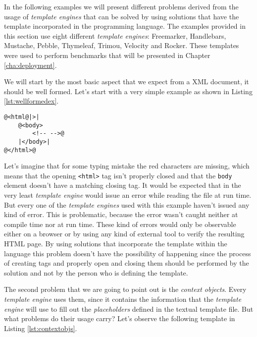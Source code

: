 \noindent
In the following examples we will present different problems derived from the usage of \textit{template engines} that can be solved by using solutions that have the template incorporated in the programming language. The examples provided in this section use eight different \textit{template engines}: Freemarker\cite{freemarker}, Handlebars\cite{handlebars}, Mustache\cite{mustache}, Pebble\cite{pebble}, Thymeleaf\cite{thymeleaf}, Trimou\cite{trimou}, Velocity\cite{velocity} and Rocker\cite{rocker}. These templates were used to perform benchmarks that will be presented in Chapter \ref{cha:deployment}.

\noindent
We will start by the most basic aspect that we expect from a \ac{XML} document, it should be well formed. Let's start with a very simple example as shown in Listing \ref{lst:wellformedex}.


\lstset{language = java}

\bigskip

\begin{minipage}{\linewidth}
\begin{lstlisting}[caption={Badly Formed Document}, label={lst:wellformedex}, style=problemex]
@<html@|>|
	@<body>
		<!-- -->@
	|</body>|
@</html>@
\end{lstlisting}
\end{minipage} 

\noindent
Let's imagine that for some typing mistake the red characters are missing, which means that the opening \texttt{<html>} tag isn't properly closed and that the \texttt{body} element doesn't have a matching closing tag. It would be expected that in the very least \textit{template engine} would issue an error while reading the file at run time. But every one of the \textit{template engines} used with this example haven't issued any kind of error. This is problematic, because the error wasn't caught neither at compile time nor at run time. These kind of errors would only be observable either on a browser or by using any kind of external tool to verify the resulting \ac{HTML} page. By using solutions that incorporate the template within the language this problem doesn't have the possibility of happening since the process of creating tags and properly open and closing them should be performed by the solution and not by the person who is defining the template.

\noindent
The second problem that we are going to point out is the \textit{context objects}. Every \textit{template engine} uses them, since it contains the information that the \textit{template engine} will use to fill out the \textit{placeholders} defined in the textual template file. But what problems do their usage carry? Let's observe the following template in Listing \ref{lst:contextobjs}.

